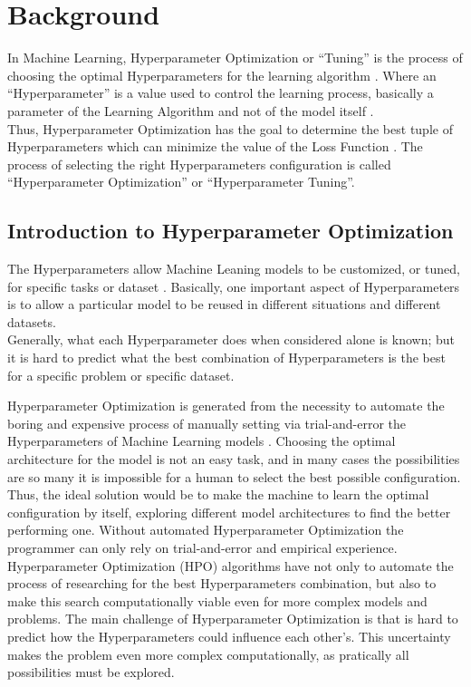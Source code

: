 \chapter{Background}

In Machine Learning, Hyperparameter Optimization or “Tuning” is the process of choosing the optimal Hyperparameters for the learning algorithm \cite{Tesi-1.10}.
Where an “Hyperparameter” is a value used to control the learning process, basically a parameter of the Learning Algorithm and not of the model itself \cite{Tesi-1.6}.
\\[0.3cm]Thus, Hyperparameter Optimization has the goal to determine the best tuple of Hyperparameters which can minimize the value of the Loss Function \cite{Tesi-1.1}.
The process of selecting the right Hyperparameters configuration is called “Hyperparameter Optimization” or “Hyperparameter Tuning”.


\section{Introduction to Hyperparameter Optimization}

The Hyperparameters allow Machine Leaning models to be customized, or tuned, for specific tasks or dataset \cite{Tesi-1.6}.
Basically, one important aspect of Hyperparameters is to allow a particular model to be reused in different situations and different datasets.
\\[0.3cm]Generally, what each Hyperparameter does when considered alone is known; but it is hard to predict what the best combination of Hyperparameters is the best for a specific problem or specific dataset.


Hyperparameter Optimization is generated from the necessity to automate the boring and expensive process of manually setting via trial-and-error the Hyperparameters of Machine Learning models \cite{Tesi-1.6}.
Choosing the optimal architecture for the model is not an easy task, and in many cases the possibilities are so many it is impossible for a human to select the best possible configuration.
Thus, the ideal solution would be to make the machine to learn the optimal configuration by itself, exploring different model architectures to find the better performing one.
Without automated Hyperparameter Optimization the programmer can only rely on trial-and-error and empirical experience.
\\[0.3cm]Hyperparameter Optimization (HPO) algorithms have not only to automate the process of researching for the best Hyperparameters combination, but also to make this search computationally viable even for more complex models and problems.
The main challenge of Hyperparameter Optimization is that is hard to predict how the Hyperparameters could influence each other's. This uncertainty makes the problem even more complex computationally, as pratically all possibilities must be explored. 


